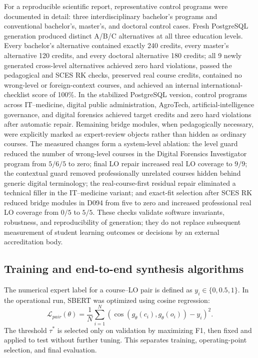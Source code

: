 \documentclass[twoside,11pt]{article}
\begin{document}
For a reproducible scientific report, representative control programs were documented in detail: three interdisciplinary bachelor's programs and conventional bachelor's, master's, and doctoral control cases. Fresh PostgreSQL generation produced distinct A/B/C alternatives at all three education levels. Every bachelor's alternative contained exactly 240 credits, every master's alternative 120 credits, and every doctoral alternative 180 credits; all 9 newly generated cross-level alternatives achieved zero hard violations, passed the pedagogical and SCES RK checks, preserved real course credits, contained no wrong-level or foreign-context courses, and achieved an internal international-checklist score of 100\%. In the stabilized PostgreSQL version, control programs across IT--medicine, digital public administration, AgroTech, artificial-intelligence governance, and digital forensics achieved target credits and zero hard violations after automatic repair. Remaining bridge modules, when pedagogically necessary, were explicitly marked as expert-review objects rather than hidden as ordinary courses. The measured changes form a system-level ablation: the level guard reduced the number of wrong-level courses in the Digital Forensics Investigator program from $5/6/5$ to zero; final LO repair increased real LO coverage to $9/9$; the contextual guard removed professionally unrelated courses hidden behind generic digital terminology; the real-course-first residual repair eliminated a technical filler in the IT--medicine variant; and exact-fit selection after SCES RK reduced bridge modules in D094 from five to zero and increased professional real LO coverage from $0/5$ to $5/5$. These checks validate software invariants, robustness, and reproducibility of generation; they do not replace subsequent measurement of student learning outcomes or decisions by an external accreditation body.

\subsection{Training and end-to-end synthesis algorithms}

The numerical expert label for a course--LO pair is defined as $y_i\in\{0,0.5,1\}$. In the operational run, SBERT was optimized using cosine regression:
\begin{equation}
  \mathcal{L}_{pair}(\theta)=\frac{1}{N}\sum_{i=1}^{N}
  \left(
  \cos\!\left(g_\theta(c_i),g_\theta(o_i)\right)-y_i
  \right)^2.
  \label{eq:sbert-pair-loss}
\end{equation}
The threshold $\tau^\ast$ is selected only on validation by maximizing F1, then fixed and applied to test without further tuning. This separates training, operating-point selection, and final evaluation.
\end{document}
